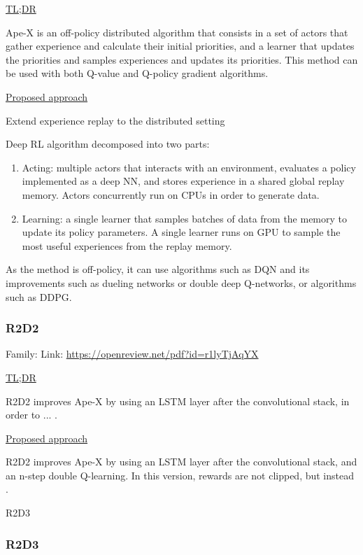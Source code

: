 \documentclass[12pt, english]{article}
\begin{document}
\underline{TL;DR}

Ape-X \cite{} is an off-policy distributed algorithm that consists in a set of actors that gather experience and calculate their initial priorities, and a learner that updates the priorities and samples experiences and updates its priorities. This method can be used with both Q-value and Q-policy gradient algorithms.

\underline{Proposed approach}

Extend experience replay to the distributed setting

Deep RL algorithm decomposed into two parts:

\begin{enumerate}
  \item Acting: multiple actors that interacts with an environment, evaluates a policy implemented as a deep NN, and stores experience in a shared global replay memory. Actors concurrently run on CPUs in order to generate data.
  \item Learning: a single learner that samples batches of data from the memory to update its policy parameters. A single learner runs on GPU to sample the most useful experiences from the replay memory.
\end{enumerate}

As the method is off-policy, it can use algorithms such as DQN and its improvements such as dueling networks or double deep Q-networks, or algorithms such as DDPG.

\subsubsection{R2D2}
\label{R2D2}

Family:
Link: \url{https://openreview.net/pdf?id=r1lyTjAqYX}

\underline{TL;DR}

R2D2 improves Ape-X by using an LSTM layer after the convolutional stack, in order to ... .

\underline{Proposed approach}

R2D2 improves Ape-X by using an LSTM layer after the convolutional stack, and an n-step double Q-learning. In this version, rewards are not clipped, but instead .


R2D3 \cite{paine_making_2019}

\subsubsection{R2D3}
\end{document}
